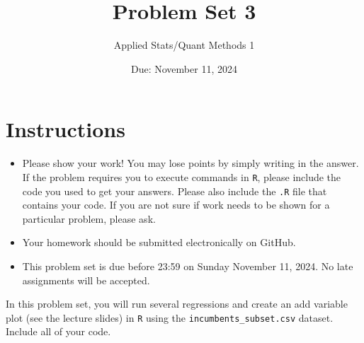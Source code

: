\documentclass[12pt,letterpaper]{article}
\title{Problem Set 3}
\date{Due: November 11, 2024}
\author{Applied Stats/Quant Methods 1}
\begin{document}
	\maketitle
	\section*{Instructions}
	\begin{itemize}
		\item Please show your work! You may lose points by simply writing in the answer. If the problem requires you to execute commands in \texttt{R}, please include the code you used to get your answers. Please also include the \texttt{.R} file that contains your code. If you are not sure if work needs to be shown for a particular problem, please ask.
	\item Your homework should be submitted electronically on GitHub.
	\item This problem set is due before 23:59 on Sunday November 11, 2024. No late assignments will be accepted.

	\end{itemize}

		\vspace{.25cm}
	
\noindent In this problem set, you will run several regressions and create an add variable plot (see the lecture slides) in \texttt{R} using the \texttt{incumbents\_subset.csv} dataset. Include all of your code.

	\vspace{.5cm}
\end{document}

